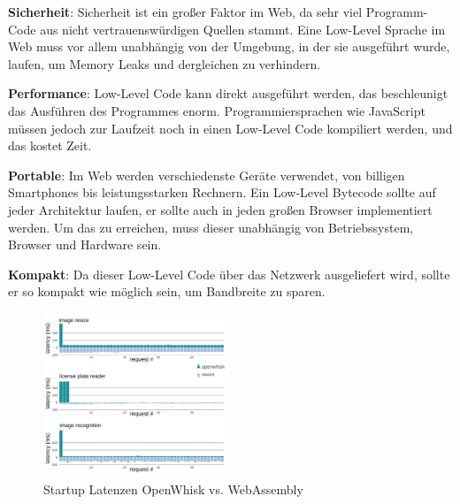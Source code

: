 \begin{flushleft}


\textbf{Sicherheit}: Sicherheit ist ein großer Faktor im Web, da sehr viel Programm-Code aus nicht vertrauenswürdigen Quellen stammt. Eine Low-Level Sprache im Web muss vor allem unabhängig von der Umgebung, in der sie ausgeführt wurde, laufen, um Memory Leaks und dergleichen zu verhindern. \autocite[]{Haas2017}

\hfill \break

\textbf{Performance}: Low-Level Code kann direkt ausgeführt werden, das beschleunigt das Ausführen des Programmes enorm. Programmiersprachen wie JavaScript müssen jedoch zur Laufzeit noch in einen Low-Level Code kompiliert werden, und das kostet Zeit. \autocite[]{Haas2017}

\hfill \break

\textbf{Portable}: Im Web werden verschiedenste Geräte verwendet, von billigen Smartphones bis leistungsstarken Rechnern. Ein Low-Level Bytecode sollte auf jeder Architektur laufen, er sollte auch in jeden großen Browser implementiert werden. Um das zu erreichen, muss dieser unabhängig von Betriebssystem, Browser und Hardware sein. \autocite[]{Haas2017}

\hfill \break

\textbf{Kompakt}: Da dieser Low-Level Code über das Netzwerk ausgeliefert wird, sollte er so kompakt wie möglich sein, um Bandbreite zu sparen. \autocite[]{Haas2017}

\end{flushleft}

\begin{figure}[t]
	\centering
	\includegraphics[width=0.5\textwidth]{images/RequestTimesSlow.png}
	\caption{
		Startup Latenzen OpenWhisk vs. WebAssembly \autocite[]{Hall2019}
	}
	\label{figure:StartupLatFirst}
\end{figure}

